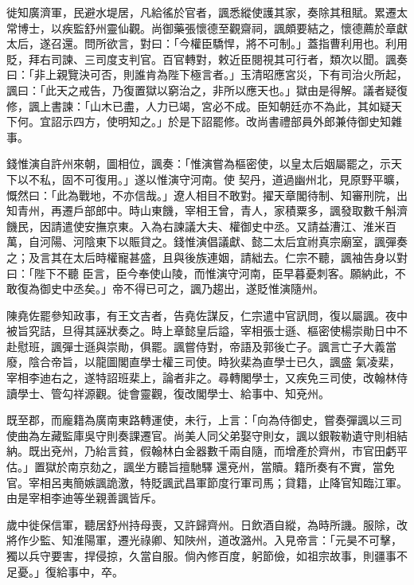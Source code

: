 \begin{pinyinscope}
 徙知廣濟軍，民避水堤居，凡給徭於官者，諷悉縱使護其家，奏除其租賦。累遷太常博士，以疾監舒州靈仙觀。尚御藥張懷德至觀齋祠，諷頗要結之，懷德薦於章獻太后，遂召還。問所欲言，對曰：「今權臣驕悍，將不可制。」蓋指曹利用也。利用貶，拜右司諫、三司度支判官。百官轉對，敕近臣閱視其可行者，類次以聞。諷奏
 曰：「非上親覽決可否，則誰肯為陛下極言者。」玉清昭應宮災，下有司治火所起，諷曰：「此天之戒告，乃復置獄以窮治之，非所以應天也。」獄由是得解。議者疑復修，諷上書諫：「山木已盡，人力已竭，宮必不成。臣知朝廷亦不為此，其如疑天下何。宜詔示四方，使明知之。」於是下詔罷修。改尚書禮部員外郎兼侍御史知雜事。



 錢惟演自許州來朝，圖相位，諷奏：「惟演嘗為樞密使，以皇太后姻屬罷之，示天下以不私，固不可復用。」遂以惟演守河南。使
 契丹，道過幽州北，見原野平曠，慨然曰：「此為戰地，不亦信哉。」遼人相目不敢對。擢天章閣待制、知審刑院，出知青州，再遷戶部郎中。時山東饑，宰相王曾，青人，家積粟多，諷發取數千斛濟饑民，因請遣使安撫京東。入為右諫議大夫、權御史中丞。又請益漕江、淮米百萬，自河陽、河陰東下以賑貸之。錢惟演倡議獻、懿二太后宜祔真宗廟室，諷彈奏之；及言其在太后時權寵甚盛，且與後族連姻，請絀去。仁宗不聽，諷袖告身以對曰：「陛下不聽
 臣言，臣今奉使山陵，而惟演守河南，臣早暮憂刺客。願納此，不敢復為御史中丞矣。」帝不得已可之，諷乃趨出，遂貶惟演隨州。



 陳堯佐罷參知政事，有王文吉者，告堯佐謀反，仁宗遣中官訊問，復以屬諷。夜中被旨究詰，旦得其誣狀奏之。時上章懿皇后謚，宰相張士遜、樞密使楊崇勛日中不赴慰班，諷彈士遜與崇勛，俱罷。諷嘗侍對，帝語及郭後亡子。諷言亡子大義當廢，陰合帝旨，以龍圖閣直學士權三司使。時狄棐為直學士已久，諷盛
 氣凌棐，宰相李迪右之，遂特詔班棐上，論者非之。尋轉閣學士，又疾免三司使，改翰林侍讀學士、管勾祥源觀。徙會靈觀，復改閣學士、給事中、知兗州。



 既至郡，而龐籍為廣南東路轉運使，未行，上言：「向為侍御史，嘗奏彈諷以三司使曲為左藏監庫吳守則奏課遷官。尚美人同父弟娶守則女，諷以銀鞍勒遺守則相結納。既出兗州，乃紿言貧，假翰林白金器數千兩自隨，而增產於齊州，市官田虧平估。」置獄於南京劾之，諷坐方聽旨擅馳驛
 還兗州，當贖。籍所奏有不實，當免官。宰相呂夷簡嫉諷詭激，特貶諷武昌軍節度行軍司馬；貸籍，止降官知臨江軍。由是宰相李迪等坐親善諷皆斥。



 歲中徙保信軍，聽居舒州持母喪，又許歸齊州。日飲酒自縱，為時所譏。服除，改將作少監、知淮陽軍，遷光祿卿、知陜州，道改潞州。入見帝言：「元昊不可擊，獨以兵守要害，捍侵掠，久當自服。倘內修百度，躬節儉，如祖宗故事，則疆事不足憂。」復給事中，卒。




\end{pinyinscope}
